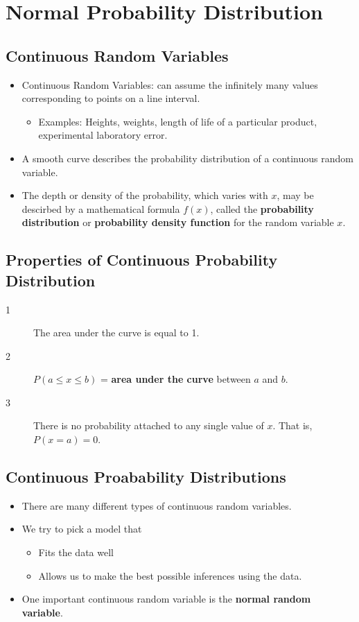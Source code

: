 \documentclass[12pt, letterpaper]{article}
\begin{document}
    \section{Normal Probability Distribution}
        \subsection{Continuous Random Variables}
            \begin{itemize}
            \item Continuous Random Variables: can assume the infinitely many values corresponding to points on a line interval.
                \begin{itemize}
                    \item Examples: Heights, weights, length of life of a particular product, experimental laboratory error.
                \end{itemize}
            \item A smooth curve describes the probability distribution of a continuous random variable.
            \item The depth or density of the probability, which varies with $x$, may be descirbed by a mathematical formula $f(x)$, called the \textbf{probability distribution} or \textbf{probability density function} for the random variable $x$.
            \end{itemize}
        \subsection{Properties of Continuous Probability Distribution}
            \begin{description}
                \item[1] The area  under the curve is equal to 1.
                \item[2] $P(a \leq x \leq b)$ = \textbf{area under the curve} between $a$ and $b$.
                \item[3] There is no probability attached to any single value of $x$. That is, $P(x = a) = 0$.
            \end{description}
        \subsection*{Continuous Proabability Distributions}
            \begin{itemize}
                \item There are many different types of continuous random variables.
                \item We try to pick a model that
                    \begin{itemize}
                        \item Fits the data well
                        \item Allows us to make the best possible inferences using the data.
                    \end{itemize}
                \item One important continuous random variable is the \textbf{normal random variable}.
            \end{itemize}
\end{document}
